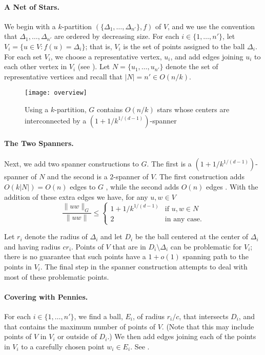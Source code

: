 \documentclass{patmorin}
\begin{document}
\paragraph{A Net of Stars.}
We begin with a $k$-partition $(\{\Delta_1,\ldots,\Delta_{n'}\},f)$
of $V$, and we use the convention that $\Delta_1,\ldots,\Delta_{n'}$
are ordered by decreasing size.  For each $i\in \{1,\ldots,n'\}$,
let $V_i=\{u\in V : f(u)=\Delta_i\}$; that is, $V_i$ is the set of
points assigned to the ball $\Delta_i$.  For each set $V_i$, we choose a
representative vertex, $u_i$, and add edges joining $u_i$ to each other
vertex in $V_i$ (see ). Let $N=\{u_1,\ldots,u_{n'}\}$
denote the set of representative vertices and recall that $|N|=n'\in
O(n/k)$.

\begin{figure}
  \begin{center} 
    \texttt{[image: overview]}
  \end{center} 
  \caption{Using a $k$-partition, $G$ contains $O(n/k)$ stars whose
    centers are interconnected by a $(1+1/k^{1/(d-1)})$-spanner}
\end{figure}

\paragraph{The Two Spanners.}
Next, we add two spanner constructions to $G$.  The first is a
$(1+1/k^{1/(d-1)})$-spanner of $N$ and the second is a $2$-spanner
of $V$.  The first construction adds $O(k|N|)=O(n)$ edges to $G$
\cite[Section~5.5]{narasimhan.smid:geometric}, while the second adds
$O(n)$ edges \cite{x,ys,ss}.  With the addition of these extra edges we
have, for any $u,w\in V$
\[
   \frac{\|uw\|_G}{\|uw\|} \le \begin{cases}
         1+1/k^{1/(d-1)} & \text{if $u,w\in N$} \\
         2 & \text{in any case.}
       \end{cases}
\]

Let $r_i$ denote the radius of $\Delta_i$ and let $D_i$ be the ball centered
at the center of $\Delta_i$ and having radius $cr_i$.  Points of $V$
that are in $D_i\setminus \Delta_i$ can be problematic for $V_i$; there
is no guarantee that such points have a $1+o(1)$ spanning path to the
points in $V_i$.  The final step in the spanner construction attempts
to deal with most of these problematic points.

\paragraph{Covering with Pennies.}
For each $i\in\{1,\ldots,n'\}$, we find a ball, $E_i$, of radius $r_i/c$,
that intersects $D_i$, and that contains the maximum number of points
of $V$.  (Note that this may include points of $V$ in $V_i$ or outside
of $D_i$.)  We then add edges joining each of the points in $V_i$ to
a carefully chosen point $w_i\in E_i$.  See .
\end{document}

